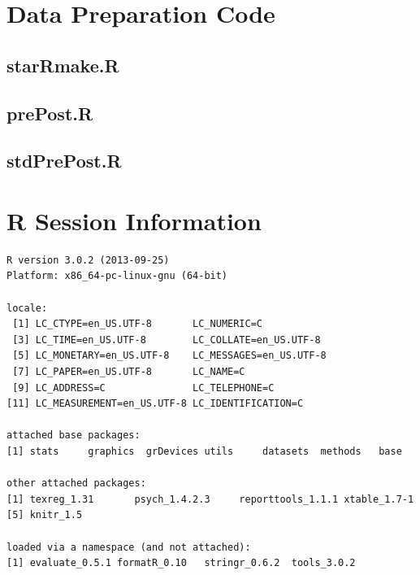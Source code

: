 \documentclass{article}\usepackage[]{graphicx}\usepackage[]{color}
\makeatletter
\newenvironment{kframe}{%
 \def\at@end@of@kframe{}%
 \ifinner\ifhmode%
  \def\at@end@of@kframe{\end{minipage}}%
  \begin{minipage}{\columnwidth}%
 \fi\fi%
 \def\FrameCommand##1{\hskip\@totalleftmargin \hskip-\fboxsep
 \colorbox{shadecolor}{##1}\hskip-\fboxsep
     \hskip-\linewidth \hskip-\@totalleftmargin \hskip\columnwidth}%
 \MakeFramed {\advance\hsize-\width
   \@totalleftmargin\z@ \linewidth\hsize
   \@setminipage}}%
 {\par\unskip\endMakeFramed%
 \at@end@of@kframe}
\newenvironment{knitrout}{}{} %
\makeatother
\begin{document}
\clearpage
\clearpage
\begin{appendices}
\section{Data Preparation Code}
\label{rcode}
\subsection{starRmake.R}

\subsection{prePost.R}

\subsection{stdPrePost.R}

\clearpage
\section{R Session Information}
\begin{knitrout}
\color{fgcolor}\begin{kframe}
\begin{verbatim}
R version 3.0.2 (2013-09-25)
Platform: x86_64-pc-linux-gnu (64-bit)

locale:
 [1] LC_CTYPE=en_US.UTF-8       LC_NUMERIC=C              
 [3] LC_TIME=en_US.UTF-8        LC_COLLATE=en_US.UTF-8    
 [5] LC_MONETARY=en_US.UTF-8    LC_MESSAGES=en_US.UTF-8   
 [7] LC_PAPER=en_US.UTF-8       LC_NAME=C                 
 [9] LC_ADDRESS=C               LC_TELEPHONE=C            
[11] LC_MEASUREMENT=en_US.UTF-8 LC_IDENTIFICATION=C       

attached base packages:
[1] stats     graphics  grDevices utils     datasets  methods   base     

other attached packages:
[1] texreg_1.31       psych_1.4.2.3     reporttools_1.1.1 xtable_1.7-1     
[5] knitr_1.5        

loaded via a namespace (and not attached):
[1] evaluate_0.5.1 formatR_0.10   stringr_0.6.2  tools_3.0.2   
\end{verbatim}
\end{kframe}
\end{knitrout}

\end{appendices}
\end{document}
